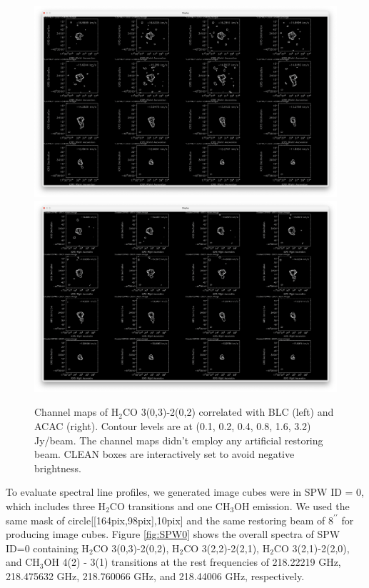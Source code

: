 \documentclass[a4paper, 10pt]{scrartcl}
\begin{document}
\begin{figure}[h]
	\centering
	\includegraphics[width=15cm]{BLC-ChanMap.png}
	\includegraphics[width=15cm]{ACA-ChanMap.png}
	\caption{Channel maps of H$_2$CO 3(0,3)-2(0,2) correlated with BLC (left) and ACAC (right). Contour levels are at (0.1, 0.2, 0.4, 0.8, 1.6,  3.2) Jy/beam. The channel maps didn't employ any artificial restoring beam. CLEAN boxes are interactively set to avoid negative brightness.}\label{fig:H2COchanMap}
\end{figure}

To evaluate spectral line profiles, we generated image cubes were in SPW ID = 0, which includes three H$_2$CO transitions and one CH$_3$OH emission.
We used the same mask of circle[[164pix,98pix],10pix] and the same restoring beam of $8^{\prime \prime}$ for producing image cubes.
Figure \ref{fig:SPW0} shows the overall spectra of SPW ID=0 containing H$_2$CO 3(0,3)-2(0,2), H$_2$CO 3(2,2)-2(2,1), H$_2$CO 3(2,1)-2(2,0), and CH$_3$OH 4(2) - 3(1) transitions at the rest frequencies of 218.22219 GHz, 218.475632 GHz, 218.760066 GHz, and 218.44006 GHz, respectively.
\end{document}
